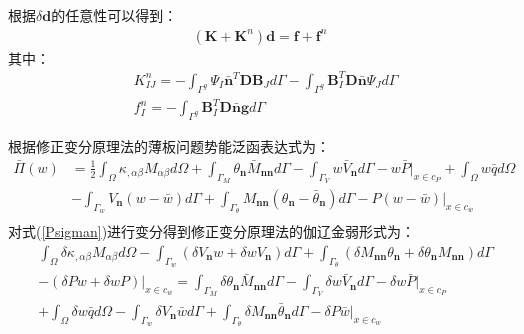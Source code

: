 根据$\delta\pmb{d}$的任意性可以得到：
\begin{equation}
\begin{split}
    (\pmb{K}+\pmb{K}^n)\pmb{d}=\pmb{f}+\pmb{f}^n
\end{split}
\end{equation}
其中：
\begin{equation}
\begin{split}
&K^n_{IJ}=-\int_{\Gamma^g}\Psi_I\bar{\pmb{n}}^T\pmb{D}\pmb{B}_Jd\Gamma-\int_{\Gamma^g}\pmb{B}_I^T\pmb{D}\bar{\pmb{n}}\Psi_Jd\Gamma\\
&f^n_I=-\int_{\Gamma^g}\pmb{B}_I^T\pmb{D}\bar{\pmb{n}}\pmb{g}d\Gamma
\end{split}
\end{equation}\par
根据\cite{}修正变分原理法的薄板问题势能泛函表达式为：
\begin{equation}\label{Psigman}
\begin{split}
    \bar{\Pi}(w)&=\frac{1}{2}\int_{\Omega}\kappa_{,\alpha\beta}M_{\alpha\beta}d\Omega+\int_{\Gamma_M}\theta_{\pmb{n}}\bar{M}_{\pmb{nn}}d\Gamma-\int_{\Gamma_V}w\bar{V}_{\pmb{n}}d\Gamma-w\bar{P}\vert_{x\in c_P}+\int_{\Omega}w\bar{q}d\Omega\\
    &-\int_{\Gamma_w}V_{\pmb{n}}(w-\bar{w})d\Gamma+\int_{\Gamma_{\theta}}M_{\pmb{nn}}(\theta_{\pmb{n}}-\bar{\theta}_{\pmb{n}})d\Gamma-P(w-\bar{w})\vert_{x\in c_w}\\
\end{split}
\end{equation}
对式(\ref{Psigman})进行变分得到修正变分原理法的伽辽金弱形式为：
\begin{equation}
    \begin{split}
    &\int_{\Omega}\delta\kappa_{,\alpha\beta}M_{\alpha\beta}d\Omega-\int_{\Gamma_w}(\delta V_{\pmb{n}}w+\delta wV_{\pmb{n}})d\Gamma+\int_{\Gamma_{\theta}}(\delta M_{\pmb{nn}}\theta_{\pmb{n}}+\delta\theta_{\pmb{n}}M_{\pmb{nn}})d\Gamma\\
    &-(\delta Pw+\delta wP)\vert_{x\in c_w}
    =\int_{\Gamma_M}\delta\theta_{\pmb{n}}\bar{M}_{\pmb{nn}}d\Gamma-\int_{\Gamma_V}\delta w\bar{V}_{\pmb{n}}d\Gamma-\delta w\bar{P}\vert_{x\in c_P}\\
    &+\int_{\Omega}\delta w\bar{q}d\Omega
    -\int_{\Gamma_w}\delta V_{\pmb{n}}\bar{w}d\Gamma+\int_{\Gamma_{\theta}}\delta M_{\pmb{nn}}\bar{\theta}_{\pmb{n}}d\Gamma-\delta P\bar{w}\vert_{x\in c_w}
\end{split}
\end{equation}\par

